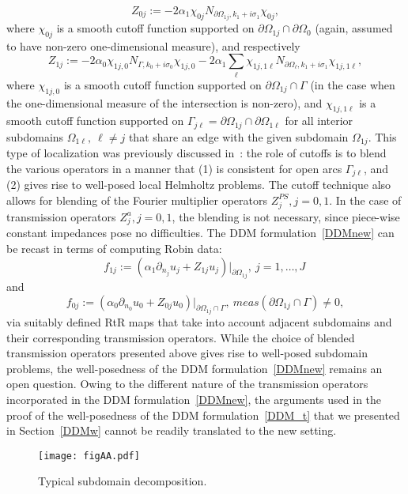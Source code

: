 \documentclass[11pt]{article}
\numberwithin{equation}{section}
\begin{document}
\begin{equation}\label{eq:first_localization}
Z_{0j}:=-2\alpha_1\chi_{0j}N_{\partial\Omega_{1j},k_1+i\sigma_1}\chi_{0j},
\end{equation}
where $\chi_{0j}$ is a smooth cutoff function supported on $\partial\Omega_{1j}\cap\partial\Omega_0$ (again, assumed to have non-zero one-dimensional measure), and respectively
\begin{equation}\label{eq:second_localization}
Z_{1j}:=-2\alpha_0\chi_{1j,0}N_{\Gamma,k_0+i\sigma_0}\chi_{1j,0}-2\alpha_1\sum_{\ell}\chi_{1j,1\ell}N_{\partial\Omega_\ell,k_1+i\sigma_1}\chi_{1j,1\ell},
\end{equation}
where $\chi_{1j,0}$ is a smooth cutoff function supported on $\partial\Omega_{1j}\cap\Gamma$ (in the case when the one-dimensional measure of the intersection is non-zero), and $\chi_{1j,1\ell}$ is a smooth cutoff function supported on $\Gamma_{j\ell}=\partial\Omega_{1j}\cap\partial\Omega_{1\ell}$ for all interior subdomains $\Omega_{1\ell},\ \ell\neq j$ that share an edge with the given subdomain $\Omega_{1j}$. This type of localization was previously discussed in~\cite{turc2016well}: the role of cutoffs is to blend the various operators in a manner that (1) is consistent for open arcs $\Gamma_{j\ell}$, and (2) gives rise to well-posed local Helmholtz problems. The cutoff technique also allows for blending of the Fourier multiplier operators $Z_j^{PS},j=0,1$. In the case of transmission operators $Z_j^a,j=0,1$, the blending is not necessary, since piece-wise constant impedances pose no difficulties. The DDM formulation~\eqref{DDMnew} can be recast in terms of computing Robin data:
\[
f_{1j}:=(\alpha_1\partial_{n_j}u_j+Z_{1j}u_j)|_{\partial\Omega_{1j}},\ j=1,\ldots,J\,
\]
and
\[
f_{0j}:=(\alpha_0\partial_{n_0}u_0+Z_{0j}u_0)|_{\partial\Omega_{1j}\cap\Gamma},\ meas(\partial\Omega_{1j}\cap\Gamma)\neq 0,
\]
via suitably defined RtR maps that take into account adjacent subdomains and their corresponding transmission operators. While the choice of blended transmission operators presented above gives rise to well-posed subdomain problems, the well-posedness of the DDM formulation~\eqref{DDMnew} remains an open question. Owing to the different nature of the transmission operators incorporated in the DDM formulation~\eqref{DDMnew}, the arguments used in the proof of the well-posedness of the DDM formulation~\eqref{DDM_t} that we presented in Section~\ref{DDMw} cannot be readily translated to the new setting.
\begin{figure}
\centering
\texttt{[image: figAA.pdf]}
\caption{Typical subdomain decomposition.}
\label{fig:subdiv1}
\end{figure}
\end{document}
